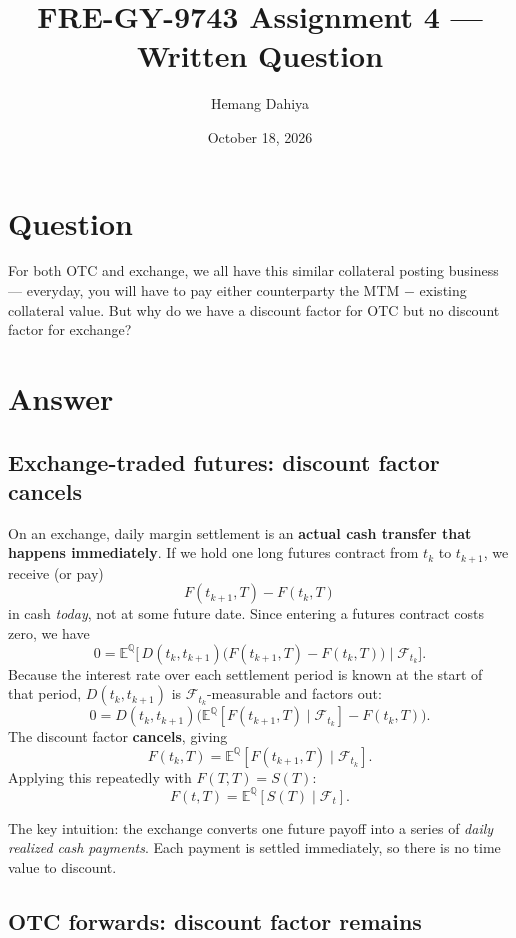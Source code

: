 \documentclass[12pt]{article}
\title{FRE-GY-9743 Assignment 4 --- Written Question}
\author{Hemang Dahiya}
\date{October 18, 2026}
\begin{document}
\maketitle

\section*{Question}

For both OTC and exchange, we all have this similar collateral posting business --- everyday, you will have to pay either counterparty the MTM $-$ existing collateral value. But why do we have a discount factor for OTC but no discount factor for exchange?

\section*{Answer}

\subsection*{Exchange-traded futures: discount factor cancels}

On an exchange, daily margin settlement is an \textbf{actual cash transfer that happens immediately}. If we hold one long futures contract from $t_k$ to $t_{k+1}$, we receive (or pay)
\[
F(t_{k+1}, T) - F(t_k, T)
\]
in cash \emph{today}, not at some future date. Since entering a futures contract costs zero, we have
\[
0 = \mathbb{E}^{\mathbb{Q}}\!\Big[\,D(t_k, t_{k+1})\big(F(t_{k+1}, T) - F(t_k, T)\big)\;\Big|\;\mathcal{F}_{t_k}\Big].
\]
Because the interest rate over each settlement period is known at the start of that period, $D(t_k, t_{k+1})$ is $\mathcal{F}_{t_k}$-measurable and factors out:
\[
0 = D(t_k, t_{k+1})\Big(\mathbb{E}^{\mathbb{Q}}[F(t_{k+1}, T) \mid \mathcal{F}_{t_k}] - F(t_k, T)\Big).
\]
The discount factor \textbf{cancels}, giving
\[
F(t_k, T) = \mathbb{E}^{\mathbb{Q}}[F(t_{k+1}, T) \mid \mathcal{F}_{t_k}].
\]
Applying this repeatedly with $F(T,T) = S(T)$:
\[
\boxed{F(t, T) = \mathbb{E}^{\mathbb{Q}}[S(T) \mid \mathcal{F}_t].}
\]

The key intuition: the exchange converts one future payoff into a series of \emph{daily realized cash payments}. Each payment is settled immediately, so there is no time value to discount.

\subsection*{OTC forwards: discount factor remains}
\end{document}
